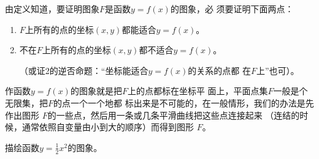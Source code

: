 由定义知道，要证明图象$F$是函数$y=f(x)$的图象，必
须要证明下面两点：
\begin{enumerate}
    \item  $F$上所有的点的坐标$(x,y)$都能适合$y=f(x)$。
\item 不在$F$上所有的点的坐标$(x,y)$都不适合$y=f(x)$。

（或证2的逆否命题：“坐标能适合$y=f(x)$的关系的点都
在$F$上”也可）。
\end{enumerate}

作函数$y=f(x)$的图象就是把$F$上的点都标在坐标平
面上，平面点集$F$一般是个无限集，把$F$的点一个一个地都
标出来是不可能的，在一般情形，我们的办法是先作出图形
$F$的一些点，然后用一条或几条平滑曲线把这些点连接起来
（连结的时候，通常依照自变量由小到大的顺序）而得到图形
$F$。

\begin{example}
描绘函数$y=\frac{1}{2}x^2$的图象。
\end{example}

